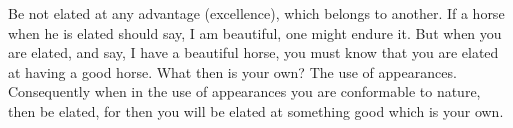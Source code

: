 Be not  elated at any  advantage (excellence), which  belongs to another.  If a
horse when he  is elated should say,  I am beautiful, one might  endure it. But
when you are elated, and say, I have  a beautiful horse, you must know that you
are  elated  at having  a  good  horse.  What then  is  your  own? The  use  of
appearances. Consequently when in the use of appearances you are conformable to
nature, then be elated, for then you  will be elated at something good which is
your own.

